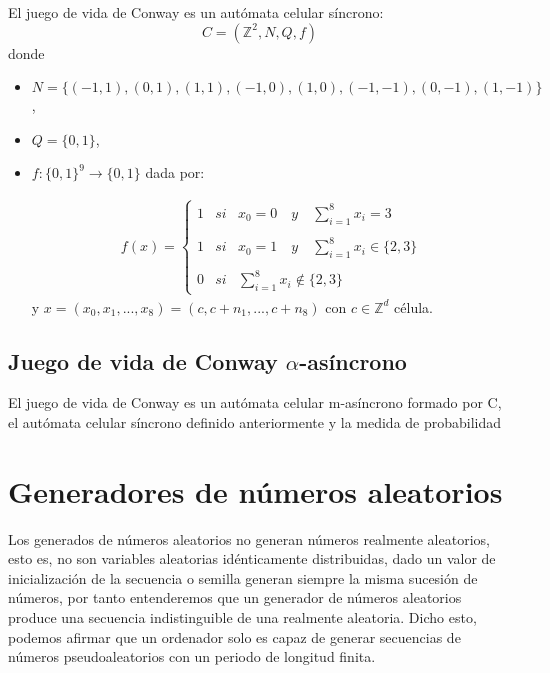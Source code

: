 \documentclass[../proyecto.tex]{memoir}
\begin{document}
\begin{defi}
El juego de vida de Conway es un autómata celular síncrono: $$
C = (\mathds{Z}^{2}, N, Q, f)
$$
donde
\begin{itemize}
\item $N=\{(-1, 1), (0, 1), (1, 1), (-1, 0), (1, 0), (-1,-1), (0,-1), (1,-1) \}$,
\item $Q=\{0,1\}$,
\item $f:\{0,1\}^{9} \rightarrow \{0,1\} $ dada por:

\begin{align*}
f(x)= \left\{ \begin{array}{lcc}
             1 &   si  & x_{0}=0 \quad y \quad \sum_{i=1}^{8} x_i = 3 \\
             \\ 1 & si & x_{0}=1 \quad y \quad \sum_{i=1}^{8} x_i \in \{2 ,3\} \\
             \\ 0 &  si  & \sum_{i=1}^{8} x_i \notin \{2, 3\} \
             \end{array}
   \right. 
\end{align*}
y $x = (x_{0}, x_{1}, ...,x_{8}) = (c,c+n_{1},...,c+n_{8})$ con $c \in \mathds{Z} ^{d}$ célula.

\end{itemize}
\end{defi}

\subsection{Juego de vida de Conway $\alpha$-asíncrono}
\begin{defi}
El juego de vida de Conway es un autómata celular m-asíncrono formado por C, el autómata celular síncrono definido anteriormente y la medida de probabilidad 
\end{defi}


\section{Generadores de números aleatorios}

Los generados de números aleatorios no generan números realmente aleatorios, esto es, no son variables aleatorias idénticamente distribuidas, dado un valor de inicialización de la secuencia o semilla generan siempre la misma sucesión de números, por tanto entenderemos que un generador de números aleatorios produce una secuencia indistinguible de una realmente aleatoria. Dicho esto, podemos afirmar que un ordenador solo es capaz de generar secuencias de números pseudoaleatorios con un periodo de longitud finita.
\end{document}
